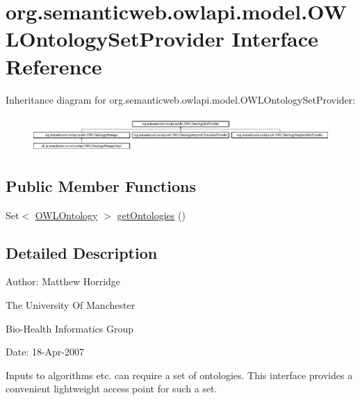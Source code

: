 \hypertarget{interfaceorg_1_1semanticweb_1_1owlapi_1_1model_1_1_o_w_l_ontology_set_provider}{\section{org.\-semanticweb.\-owlapi.\-model.\-O\-W\-L\-Ontology\-Set\-Provider Interface Reference}
\label{interfaceorg_1_1semanticweb_1_1owlapi_1_1model_1_1_o_w_l_ontology_set_provider}
}
Inheritance diagram for org.\-semanticweb.\-owlapi.\-model.\-O\-W\-L\-Ontology\-Set\-Provider\-:\begin{figure}[H]
\begin{center}
\leavevmode
\includegraphics[height=1.369193cm]{interfaceorg_1_1semanticweb_1_1owlapi_1_1model_1_1_o_w_l_ontology_set_provider}
\end{center}
\end{figure}
\subsection*{Public Member Functions}
\begin{DoxyCompactItemize}
\item 
Set$<$ \hyperlink{interfaceorg_1_1semanticweb_1_1owlapi_1_1model_1_1_o_w_l_ontology}{O\-W\-L\-Ontology} $>$ \hyperlink{interfaceorg_1_1semanticweb_1_1owlapi_1_1model_1_1_o_w_l_ontology_set_provider_a14932c95a117764e2a1d896eecb29dec}{get\-Ontologies} ()
\end{DoxyCompactItemize}


\subsection{Detailed Description}
Author\-: Matthew Horridge\par
 The University Of Manchester\par
 Bio-\/\-Health Informatics Group\par
 Date\-: 18-\/\-Apr-\/2007\par
\par


Inputs to algorithms etc. can require a set of ontologies. This interface provides a convenient lightweight access point for such a set. 

